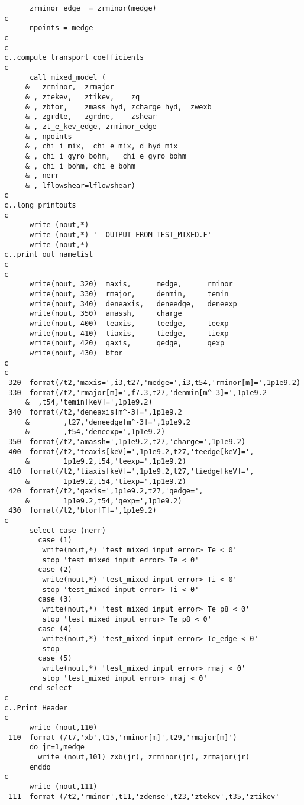 \begin{verbatim}
      zrminor_edge  = zrminor(medge)
c
      npoints = medge
c
c
c..compute transport coefficients
c
      call mixed_model (
     &   zrminor,  zrmajor
     & , ztekev,   ztikev,    zq
     & , zbtor,    zmass_hyd, zcharge_hyd,  zwexb
     & , zgrdte,   zgrdne,    zshear
     & , zt_e_kev_edge, zrminor_edge
     & , npoints
     & , chi_i_mix,  chi_e_mix, d_hyd_mix
     & , chi_i_gyro_bohm,   chi_e_gyro_bohm
     & , chi_i_bohm, chi_e_bohm
     & , nerr
     & , lflowshear=lflowshear)
c
c..long printouts
c
      write (nout,*)
      write (nout,*) '  OUTPUT FROM TEST_MIXED.F'
      write (nout,*)
c..print out namelist
c
c
      write(nout, 320)  maxis,      medge,      rminor
      write(nout, 330)  rmajor,     denmin,     temin
      write(nout, 340)  deneaxis,   deneedge,   deneexp
      write(nout, 350)  amassh,     charge
      write(nout, 400)  teaxis,     teedge,     teexp
      write(nout, 410)  tiaxis,     tiedge,     tiexp
      write(nout, 420)  qaxis,      qedge,      qexp
      write(nout, 430)  btor
c
c
 320  format(/t2,'maxis=',i3,t27,'medge=',i3,t54,'rminor[m]=',1p1e9.2)
 330  format(/t2,'rmajor[m]=',f7.3,t27,'denmin[m^-3]=',1p1e9.2
     &  ,t54,'temin[keV]=',1p1e9.2)
 340  format(/t2,'deneaxis[m^-3]=',1p1e9.2
     &        ,t27,'deneedge[m^-3]=',1p1e9.2
     &        ,t54,'deneexp=',1p1e9.2)
 350  format(/t2,'amassh=',1p1e9.2,t27,'charge=',1p1e9.2)
 400  format(/t2,'teaxis[keV]=',1p1e9.2,t27,'teedge[keV]=',
     &        1p1e9.2,t54,'teexp=',1p1e9.2)
 410  format(/t2,'tiaxis[keV]=',1p1e9.2,t27,'tiedge[keV]=',
     &        1p1e9.2,t54,'tiexp=',1p1e9.2)
 420  format(/t2,'qaxis=',1p1e9.2,t27,'qedge=',
     &        1p1e9.2,t54,'qexp=',1p1e9.2)
 430  format(/t2,'btor[T]=',1p1e9.2)
c
      select case (nerr)
        case (1)
         write(nout,*) 'test_mixed input error> Te < 0'
         stop 'test_mixed input error> Te < 0'
        case (2)
         write(nout,*) 'test_mixed input error> Ti < 0'
         stop 'test_mixed input error> Ti < 0'
        case (3)
         write(nout,*) 'test_mixed input error> Te_p8 < 0'
         stop 'test_mixed input error> Te_p8 < 0'
        case (4)
         write(nout,*) 'test_mixed input error> Te_edge < 0'
         stop
        case (5)
         write(nout,*) 'test_mixed input error> rmaj < 0'
         stop 'test_mixed input error> rmaj < 0'
      end select
c
c..Print Header
c
      write (nout,110)
 110  format (/t7,'xb',t15,'rminor[m]',t29,'rmajor[m]')
      do jr=1,medge
        write (nout,101) zxb(jr), zrminor(jr), zrmajor(jr)
      enddo
c
      write (nout,111)
 111  format (/t2,'rminor',t11,'zdense',t23,'ztekev',t35,'ztikev'

\end{verbatim}
